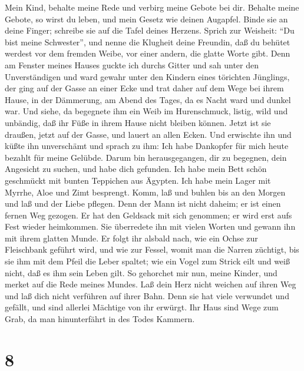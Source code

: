  Mein Kind, behalte meine Rede und verbirg meine Gebote bei
dir.  Behalte meine Gebote, so wirst du leben, und mein
Gesetz wie deinen Augapfel.  Binde sie an deine Finger;
schreibe sie auf die Tafel deines Herzens.  Sprich zur
Weisheit: ``Du bist meine Schwester'', und nenne die Klugheit deine
Freundin,  daß du behütet werdest vor dem fremden Weibe, vor
einer andern, die glatte Worte gibt.  Denn am Fenster meines
Hauses guckte ich durchs Gitter  und sah unter den
Unverständigen und ward gewahr unter den Kindern eines törichten
Jünglings,  der ging auf der Gasse an einer Ecke und trat
daher auf dem Wege bei ihrem Hause,  in der Dämmerung, am
Abend des Tages, da es Nacht ward und dunkel war.  Und
siehe, da begegnete ihm ein Weib im Hurenschmuck, listig, 
wild und unbändig, daß ihr Füße in ihrem Hause nicht bleiben können.
 Jetzt ist sie draußen, jetzt auf der Gasse, und lauert an
allen Ecken.  Und erwischte ihn und küßte ihn unverschämt
und sprach zu ihm:  Ich habe Dankopfer für mich heute
bezahlt für meine Gelübde.  Darum bin herausgegangen, dir
zu begegnen, dein Angesicht zu suchen, und habe dich gefunden.
 Ich habe mein Bett schön geschmückt mit bunten Teppichen
aus Ägypten.  Ich habe mein Lager mit Myrrhe, Aloe und Zimt
besprengt.  Komm, laß und buhlen bis an den Morgen und laß
und der Liebe pflegen.  Denn der Mann ist nicht daheim; er
ist einen fernen Weg gezogen.  Er hat den Geldsack mit sich
genommen; er wird erst aufs Fest wieder heimkommen.  Sie
überredete ihn mit vielen Worten und gewann ihn mit ihrem glatten Munde.
 Er folgt ihr alsbald nach, wie ein Ochse zur Fleischbank
geführt wird, und wie zur Fessel, womit man die Narren züchtigt,
 bis sie ihm mit dem Pfeil die Leber spaltet; wie ein Vogel
zum Strick eilt und weiß nicht, daß es ihm sein Leben gilt.
 So gehorchet mir nun, meine Kinder, und merket auf die
Rede meines Mundes.  Laß dein Herz nicht weichen auf ihren
Weg und laß dich nicht verführen auf ihrer Bahn.  Denn sie
hat viele verwundet und gefällt, und sind allerlei Mächtige von ihr
erwürgt.  Ihr Haus sind Wege zum Grab, da man hinunterfährt
in des Todes Kammern.

\hypertarget{section-7}{%
\section{8}\label{section-7}}

